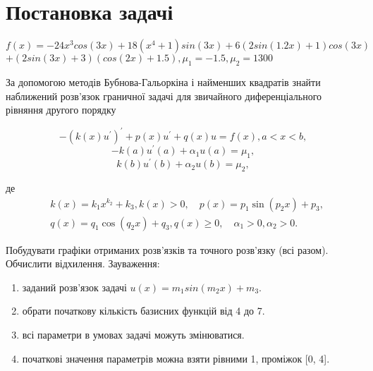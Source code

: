 \chapter{Постановка задачі}

$f(x) = -24 x^3 cos(3 x) + 18(x^4 + 1)sin(3x) + 6(2sin(1.2x) + 1)cos(3x)$ 
$+ (2sin(3x) + 3)(cos(2x) + 1.5), \mu_1 = -1.5, \mu_2 = 1300$


За допомогою методів Бубнова-Гальоркіна і найменших квадратів знайти наближений
розв'язок граничної задачі для звичайного диференціального рівняння
другого порядку


$$-(k(x) u^{\prime})^{\prime}+p(x) u^{\prime}+q(x) u=f(x), a<x<b,$$ 
$$-k(a) u^{\prime}(a)+\alpha_1 u(a)=\mu_1,$$
$$ k(b) u^{\prime}(b)+\alpha_2 u(b)=\mu_2,$$

де
$$
\begin{aligned}
& k(x)=k_1 x^{k_2}+k_3, k(x)>0, \quad p(x)=p_1 \sin \left(p_2 x\right)+p_3, \\
& q(x)=q_1 \cos \left(q_2 x\right)+q_3, q(x) \geq 0, \quad \alpha_1>0, \alpha_2>0 .
\end{aligned}
$$

Побудувати графіки отриманих розв'язків та точного розв'язку (всі разом).
Обчислити відхилення.
Зауваження:

\begin{enumerate}
    \item заданий розв'язок задачі $u(x) = m_1 sin(m_2 x) +m_3$.
    \item обрати початкову кількість базисних функцій від 4 до 7.
    \item всі параметри в умовах задачі можуть змінюватися.
    \item початкові значення параметрів можна взяти рівними 1, проміжок [0, 4].
\end{enumerate}

